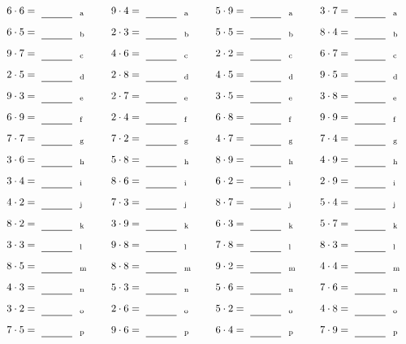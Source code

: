 \documentclass
[
  draft    = true,
  fontsize = 11pt,
  parskip  = half-
]
{scrartcl}
\begin{document}
\par\vfill\par
\begin{align*}
    \pline{6\cdot6}&=\rline{a}
  & \pline{9\cdot4}&=\rline{a}
  & \pline{5\cdot9}&=\rline{a}
  & \pline{3\cdot7}&=\rline{a} \\[1ex]
    \pline{6\cdot5}&=\rline{b}
  & \pline{2\cdot3}&=\rline{b}
  & \pline{5\cdot5}&=\rline{b}
  & \pline{8\cdot4}&=\rline{b} \\[1ex]
    \pline{9\cdot7}&=\rline{c}
  & \pline{4\cdot6}&=\rline{c}
  & \pline{2\cdot2}&=\rline{c}
  & \pline{6\cdot7}&=\rline{c} \\[1ex]
    \pline{2\cdot5}&=\rline{d}
  & \pline{2\cdot8}&=\rline{d}
  & \pline{4\cdot5}&=\rline{d}
  & \pline{9\cdot5}&=\rline{d} \\[1ex]
    \pline{9\cdot3}&=\rline{e}
  & \pline{2\cdot7}&=\rline{e}
  & \pline{3\cdot5}&=\rline{e}
  & \pline{3\cdot8}&=\rline{e} \\[1ex]
    \pline{6\cdot9}&=\rline{f}
  & \pline{2\cdot4}&=\rline{f}
  & \pline{6\cdot8}&=\rline{f}
  & \pline{9\cdot9}&=\rline{f} \\[1ex]
    \pline{7\cdot7}&=\rline{g}
  & \pline{7\cdot2}&=\rline{g}
  & \pline{4\cdot7}&=\rline{g}
  & \pline{7\cdot4}&=\rline{g} \\[1ex]
    \pline{3\cdot6}&=\rline{h}
  & \pline{5\cdot8}&=\rline{h}
  & \pline{8\cdot9}&=\rline{h}
  & \pline{4\cdot9}&=\rline{h} \\[1ex]
    \pline{3\cdot4}&=\rline{i}
  & \pline{8\cdot6}&=\rline{i}
  & \pline{6\cdot2}&=\rline{i}
  & \pline{2\cdot9}&=\rline{i} \\[1ex]
    \pline{4\cdot2}&=\rline{j}
  & \pline{7\cdot3}&=\rline{j}
  & \pline{8\cdot7}&=\rline{j}
  & \pline{5\cdot4}&=\rline{j} \\[1ex]
    \pline{8\cdot2}&=\rline{k}
  & \pline{3\cdot9}&=\rline{k}
  & \pline{6\cdot3}&=\rline{k}
  & \pline{5\cdot7}&=\rline{k} \\[1ex]
    \pline{3\cdot3}&=\rline{l}
  & \pline{9\cdot8}&=\rline{l}
  & \pline{7\cdot8}&=\rline{l}
  & \pline{8\cdot3}&=\rline{l} \\[1ex]
    \pline{8\cdot5}&=\rline{m}
  & \pline{8\cdot8}&=\rline{m}
  & \pline{9\cdot2}&=\rline{m}
  & \pline{4\cdot4}&=\rline{m} \\[1ex]
    \pline{4\cdot3}&=\rline{n}
  & \pline{5\cdot3}&=\rline{n}
  & \pline{5\cdot6}&=\rline{n}
  & \pline{7\cdot6}&=\rline{n} \\[1ex]
    \pline{3\cdot2}&=\rline{o}
  & \pline{2\cdot6}&=\rline{o}
  & \pline{5\cdot2}&=\rline{o}
  & \pline{4\cdot8}&=\rline{o} \\[1ex]
    \pline{7\cdot5}&=\rline{p}
  & \pline{9\cdot6}&=\rline{p}
  & \pline{6\cdot4}&=\rline{p}
  & \pline{7\cdot9}&=\rline{p}
\end{align*}
\end{document}
